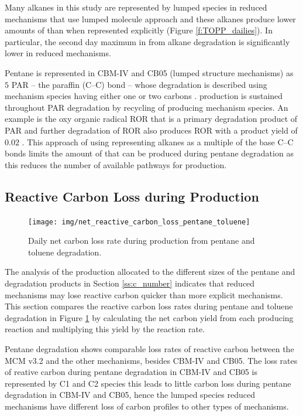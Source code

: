 Many alkanes in this study are represented by lumped species in reduced mechanisms that use lumped molecule approach and these alkanes produce lower amounts of  than when represented explicitly (Figure \ref{f:TOPP_dailies}).
In particular, the second day maximum in  from alkane degradation is significantly lower in reduced mechanisms.

Pentane is represented in CBM-IV and CB05 (lumped structure mechanisms) as $5$ PAR -- the paraffin (C--C) bond -- whose degradation is described using mechanism species having either one or two carbons \citep{Gery:1989, Yarwood:2005}. 
 production is sustained throughout PAR degradation by recycling of  producing mechanism species.
An example is the oxy organic radical ROR that is a primary degradation product of PAR and further degradation of ROR also produces ROR with a product yield of $0.02$ \citep{Gery:1989}.
This approach of using representing alkanes as a multiple of the base C--C bonds limits the amount of  that can be produced during pentane degradation as this reduces the number of available pathways for  production.

\subsection[Reactive Carbon Loss during Ox Production]{Reactive Carbon Loss during  Production} \label{ss:carbon_loss}

\begin{figure}
    \centering
    \texttt{[image: img/net\_reactive\_carbon\_loss\_pentane\_toluene]}
    \vspace{0mm}
    \caption{Daily net carbon loss rate during  production from pentane and toluene degradation.}
    \vspace{-4mm}
    \label{f:net_carbon_loss}
\end{figure}

The analysis of the  production allocated to the different sizes of the pentane and degradation products in Section \ref{ss:c_number} indicates that reduced mechanisms may lose reactive carbon quicker than more explicit mechanisms.
This section compares the reactive carbon loss rates during pentane and toluene degradation in Figure \ref{f:net_carbon_loss} by calculating the net carbon yield from each  producing reaction and multiplying this yield by the reaction rate.

Pentane degradation shows comparable loss rates of reactive carbon between the MCM v3.2 and the other mechanisms, besides CBM-IV and CB05.
The loss rates of reative carbon during pentane degradation in CBM-IV and CB05 is represented by C1 and C2 species this leads to little carbon loss during pentane degradation in CBM-IV and CB05, hence the lumped species reduced mechanisms have different loss of carbon profiles to other types of mechanisms.

